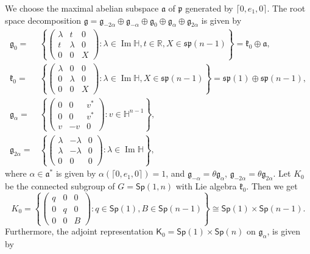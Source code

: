 \documentclass[12pt, a4paper,draft]{amsart}
\newcommand{\g}{\mathfrak}
\newcommand{\R}{\mathbb{R}}
\renewcommand{\H}{\mathbb{H}}
\renewcommand{\Im}{\operatorname{Im}}
\newcommand{\Sp}{\mathsf{Sp}}
\theoremstyle{remark}
\begin{document}
We choose the maximal abelian subspace $\g{a}$ of $\g{p}$ generated by $\lceil 0,e_{1},0\rceil$.
The root space decomposition $\g{g}=\g{g}_{-2\alpha}\oplus\g{g}_{-\alpha}\oplus\g{g}_{0}\oplus\g{g}_{\alpha}\oplus\g{g}_{2\alpha}$ is given by
\[
\begin{aligned}
\g{g}_{0}={}&\left\{
	\left(
		\begin{array}{cc|c}
			\lambda & t & 0 \\
			t & \lambda & 0 \\
			\hline
			0 & 0 & X
		\end{array}
	\right)\colon \lambda\in\Im\H,t\in\R,X\in\g{sp}(n-1)
\right\}=\g{k}_{0}\oplus \g{a}, \\
\g{k}_{0}={}&\left\{
\left(
\begin{array}{cc|c}
	\lambda & 0 & 0 \\
	0 & \lambda & 0 \\
	\hline
	0 & 0 & X
\end{array}
\right)\colon \lambda\in\Im\H,X\in\g{sp}(n-1)
\right\}=\g{sp}(1)\oplus \g{sp}(n-1), \\
\g{g}_{\alpha}={}&\left\{
	\left(
		\begin{array}{cc|c}
			0 & 0 & v^{*} \\
			0 & 0 & v^{*} \\
			\hline
			v & -v & 0
		\end{array}
	\right)\colon v\in \H^{n-1}
\right\}, \\
\g{g}_{2\alpha}={}&\left\{
	\left(
		\begin{array}{cc|c}
			\lambda & -\lambda & 0 \\
			\lambda & -\lambda & 0 \\
			\hline
			0 & 0 & 0
		\end{array}
	\right)\colon \lambda\in \Im \H
\right\},
\end{aligned}
\]
where $\alpha\in\g{a}^*$ is given by $\alpha(\lceil 0,e_1,0\rceil)=1$, 
and $\g{g}_{-\alpha}=\theta\g{g}_\alpha$, $\g{g}_{-2\alpha}=\theta\g{g}_{2\alpha}$.
Let ${K}_{0}$ be the connected subgroup of ${G}=\Sp(1,n)$ with Lie algebra $\g{k}_{0}$.
Then we get
\[
{K}_{0}=\left\{
	\left(
		\begin{array}{cc|c}
			q & 0 & 0 \\
			0 & q & 0 \\
			\hline
			0 & 0 & B
		\end{array}
	\right)\colon q\in\mathsf{Sp}(1),B\in\mathsf{Sp}(n-1)
\right\}
\cong\mathsf{Sp}(1)\times\mathsf{Sp}(n-1).
\]
Furthermore, the adjoint representation $\mathsf{K}_{0}=\Sp(1)\times\Sp(n)$ on $\g{g}_{\alpha}$, is given by
\end{document}

